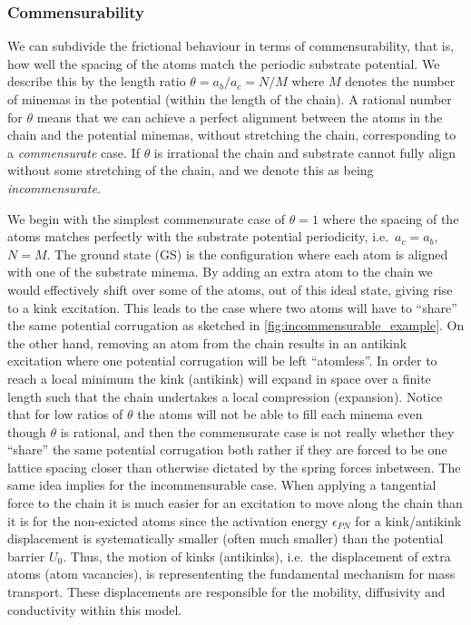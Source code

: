 \subsubsection{Commensurability} We can subdivide the frictional behaviour in terms of commensurability, that is, how well the spacing of the atoms match the periodic substrate potential. We describe this by the length ratio $\theta = a_b / a_c = N / M$ where $M$ denotes the number of minemas in the potential (within the length of the chain). A rational number for $\theta$ means that we can achieve a perfect alignment between the atoms in the chain and the potential minemas, without stretching the chain, corresponding to a \textit{commensurate} case. If $\theta$ is irrational the chain and substrate cannot fully align without some stretching of the chain, and we denote this as being \textit{incommensurate}.

We begin with the simplest commensurate case of $\theta = 1$ where the spacing
of the atoms matches perfectly with the substrate potential periodicity, i.e.\
$a_c = a_b$, $N = M$. The ground state (\acrshort{GS}) is the configuration where each atom
is aligned with one of the substrate minema. By adding an extra atom to the chain we would effectively shift over some of the atoms, out of this ideal state, giving rise to a kink excitation. This leads to the case where two atoms will have to ``share'' the same potential corrugation as sketched in \cref{fig:incommensurable_example}.  On the
other hand, removing an atom from the chain results in an antikink excitation
where one potential corrugation will be left ``atomless''. In order to reach a
local minimum the kink (antikink) will expand in space over a finite length such
that the chain undertakes a local compression (expansion). Notice that for low ratios of $\theta$ the atoms will not be able to fill each minema even though $\theta$ is rational, and then the commensurate case is not really whether they ``share'' the same potential corrugation both rather if they are forced to be one lattice spacing closer than otherwise dictated by the spring forces inbetween. The same idea implies for the incommensurable case. When applying a
tangential force to the chain it is much easier for an excitation to move along
the chain than it is for the non-exicted atoms since the activation energy
$\epsilon_{PN}$ for a kink/antikink displacement is systematically smaller
(often much smaller) than the potential barrier $U_0$. Thus, the motion of kinks
(antikinks), i.e.\ the displacement of extra atoms (atom vacancies), is
represententing the fundamental mechanism for mass transport. These
displacements are responsible for the mobility, diffusivity and conductivity
within this model. 

